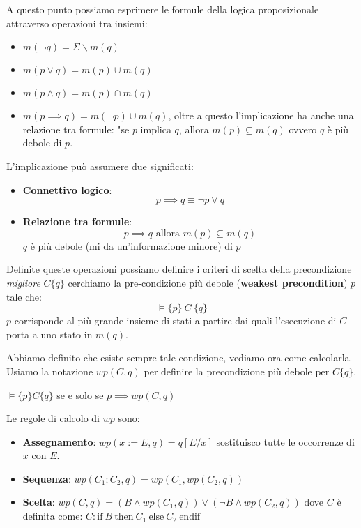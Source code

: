 A questo punto possiamo esprimere le formule della logica proposizionale
attraverso operazioni tra insiemi:
\begin{itemize}
    \item $m(\lnot q) = \Sigma \backslash m(q)$
    \item $m(p \lor q) = m(p) \cup m(q)$
    \item $m(p \land q) = m(p) \cap m(q)$
    \item $m(p \implies q) = m(\lnot p) \cup m(q)$, oltre a questo l'implicazione
          ha anche una relazione tra formule: "se $p$ implica $q$, allora
          $m(p) \subseteq m(q)$ ovvero $q$ è più debole di $p$.
\end{itemize}
\begin{nota}
    L'implicazione può assumere due significati:
    \begin{itemize}
        \item \textbf{Connettivo logico}:
              \begin{equation}
                  p \implies q \equiv \lnot p \lor q
              \end{equation}
        \item \textbf{Relazione tra formule}:
              \begin{equation}
                  p\implies q \text{ allora } m(p)\subseteq m(q)
              \end{equation}
              $q$ è più debole (mi da un'informazione minore) di $p$
    \end{itemize}
\end{nota}
Definite queste operazioni possiamo definire i criteri di scelta della precondizione
\textit{migliore} $C \{q\}$ cerchiamo la pre-condizione più debole
(\textbf{weakest precondition}) $p$ tale che:
\begin{equation}
    \models \{p\} \ C \ \{q\}
\end{equation}
$p$ corrisponde al più grande insieme di stati a partire dai quali l'esecuzione
di $C$ porta a uno stato in $m(q)$.

Abbiamo definito che esiste sempre tale condizione, vediamo ora come calcolarla.
Usiamo la notazione $wp(C, q)$ per definire la precondizione più debole per $C
    \{q\}$.
\begin{teorema}
    $\models \{p\} C \{q\}$ se e solo se $p \implies wp(C, q)$
\end{teorema}
Le regole di calcolo di $wp$ sono:
\begin{itemize}
    \item \textbf{Assegnamento}: $wp(x := E, q) = q[E / x]$ sostituisco tutte le
          occorrenze di $x$ con $E$.
    \item \textbf{Sequenza}: $wp(C_1;C_2, q) = wp(C_1, wp(C_2, q))$
    \item \textbf{Scelta}: $wp(C, q) = (B \land wp(C_1, q)) \lor (\lnot B \land
              wp(C_2, q))$ dove $C$ è definita come: $C: \text{if} \ B \
              \text{then} \ C_1 \ \text{else} \ C_2 \ \text{endif}$
\end{itemize}